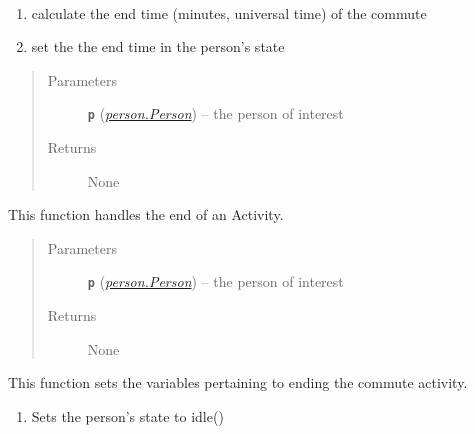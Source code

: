 \documentclass[letterpaper,10pt,english]{sphinxmanual}
\begin{document}
\begin{fulllineitems}
\begin{fulllineitems}
\label{commute:commute.Commute_From_Work.calc_end_time}~\begin{enumerate}
\item {} 
calculate the end time (minutes, universal time) of the commute

\item {} 
set the the end time in the person's state

\end{enumerate}
\begin{quote}\begin{description}
\item[{Parameters}] \leavevmode
\textbf{\texttt{p}} ({\hyperref[person:person.Person]{\emph{\emph{person.Person}}}}) -- the person of interest

\item[{Returns}] \leavevmode
None

\end{description}\end{quote}

\end{fulllineitems}


\begin{fulllineitems}
\label{commute:commute.Commute_From_Work.end}
This function handles the end of an Activity.
\begin{quote}\begin{description}
\item[{Parameters}] \leavevmode
\textbf{\texttt{p}} ({\hyperref[person:person.Person]{\emph{\emph{person.Person}}}}) -- the person of interest

\item[{Returns}] \leavevmode
None

\end{description}\end{quote}

\end{fulllineitems}


\begin{fulllineitems}
\label{commute:commute.Commute_From_Work.end_commute}
This function sets the variables pertaining to ending the commute activity.
\begin{enumerate}
\item {} 
Sets the person's state to idle()


\end{enumerate}
\end{fulllineitems}
\end{fulllineitems}
\end{document}
